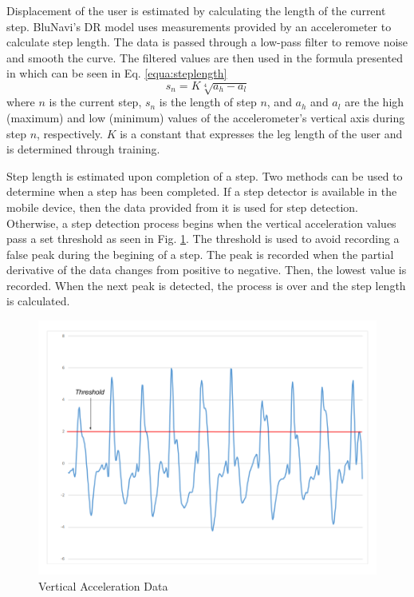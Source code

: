 \documentclass[conference]{IEEEtran}
\begin{document}
Displacement of the user is estimated by calculating the length of the current step. BluNavi's DR model uses measurements provided by an accelerometer to calculate step length. The data is passed through a low-pass filter to remove noise and smooth the curve. The filtered values are then used in the formula presented in \cite{bao2013indoor} which can be seen in Eq. \ref{equa:steplength}
\begin{equation}
\label{equa:steplength}
s_n = K\sqrt[4]{a_h - a_l}
\end{equation}
where $n$ is the current step, $s_n$ is the length of step $n$, and $a_h$ and $a_l$ are the high (maximum) and low (minimum) values of the accelerometer's vertical axis during step $n$, respectively. $K$ is a constant that expresses the leg length of the user and is determined through training.

Step length is estimated upon completion of a step. Two methods can be used to determine when a step has been completed. If a step detector is available in the mobile device, then the data provided from it is used for step detection. Otherwise, a step detection process begins when the vertical acceleration values pass a set threshold as seen in Fig. \ref{fig:accgraph}. The threshold is used to avoid recording a false peak during the begining of a step. The peak is recorded when the partial derivative of the data changes from positive to negative. Then, the lowest value is recorded. When the next peak is detected, the process is over and the step length is calculated.

\begin{figure}[h]
\centering
\includegraphics[scale=0.25]{AccelerometerGraph.png}
\caption{Vertical Acceleration Data}
\captionsetup{justification=centering,margin=2cm}
\label{fig:accgraph}
\end{figure}
\end{document}
